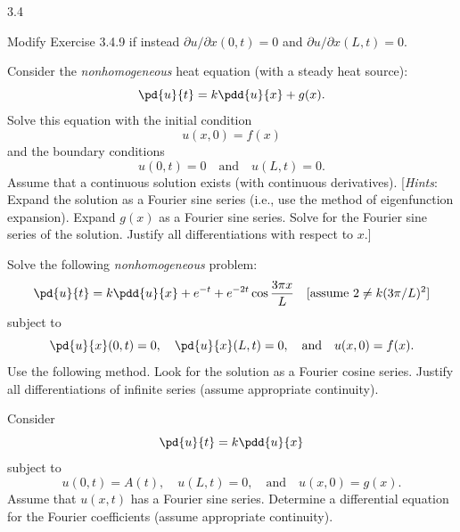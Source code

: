 \begin{exercises}{3.4}
\item Modify Exercise 3.4.9 if instead $\partial u/\partial x(0,t) = 0$ and $\partial u/\partial x(L,t) = 0$.

\item Consider the \textit{nonhomogeneous} heat equation (with a steady heat source):
\[
\pd{u}{t} = k\pdd{u}{x} + g(x).
\]
Solve this equation with the initial condition
\[
u(x,0) = f(x)
\]
and the boundary conditions
\[
u(0,t) = 0 \quad \text{and} \quad u(L,t) = 0.
\]
Assume that a continuous solution exists (with continuous derivatives).  [\textit{Hints}: Expand the solution as a Fourier sine series (i.e., use the method of eigenfunction expansion).  Expand $g(x)$ as a Fourier sine series.  Solve for the Fourier sine series of the solution.  Justify all differentiations with respect to $x$.]

\item[\starred 3.4.12.] Solve the following \textit{nonhomogeneous} problem:
\[
\pd{u}{t} = k\pdd{u}{x} + e^{-t} + e^{-2t}\cos\frac{3\pi x}{L} \quad [\text{assume } 2 \ne k(3\pi/L)^2]
\]
subject to
\[
\pd{u}{x}(0,t) = 0, \quad \pd{u}{x}(L,t) = 0, \quad \text{and} \quad u(x,0) = f(x).
\]
Use the following method.  Look for the solution as a Fourier cosine series.  Justify all differentiations of infinite series (assume appropriate continuity).

\item Consider
\[
\pd{u}{t} = k\pdd{u}{x}
\]
subject to
\[
u(0,t) = A(t), \quad u(L,t) = 0, \quad \text{and} \quad u(x,0) = g(x).
\]
Assume that $u(x,t)$ has a Fourier sine series.  Determine a differential equation for the Fourier coefficients (assume appropriate continuity).
\end{exercises}

